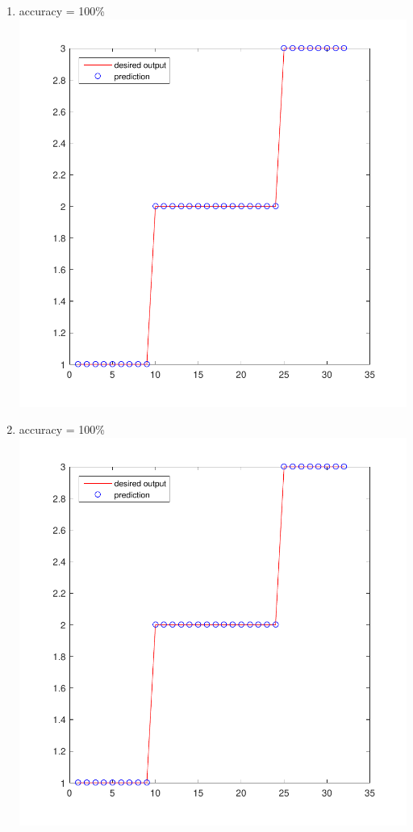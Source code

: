 \documentclass[12pt,a4paper]{article}
\begin{document}
\begin{CJK}{UTF8}{bsmi}
\begin{enumerate}
\begin{enumerate}
\begin{enumerate}
\begin{enumerate}
			\newpage	
			\item accuracy = 100\%\ \\
			\includegraphics[scale=0.6]{winehs1}	
			\item accuracy = 100\%\ \\
			\includegraphics[scale=0.6]{winehs1}		
			\newpage	
		\end{enumerate}
	\end{enumerate}
	

\end{enumerate}
\end{enumerate}
\end{CJK}
\end{document}
